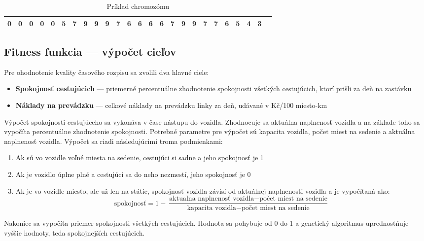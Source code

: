 \begin{table}[h]\label{tab:chromosome}
  \centering
  \begin{tabularx}{\textwidth}{|l|X|X|X|X|X|X|X|X|X|X|X|X|X|X|X|X|X|X|X|X|X|X|X|X|}
    \hline
    0 & 0 & 0 & 0 & 0 & 5 & 7 & 9 & 9 & 9 & 7 & 6 & 6 & 6 & 6 & 7 & 9 & 9 & 7 & 7 & 6 & 5 & 4 & 3 \\ \hline
  \end{tabularx}
  \caption{Príklad chromozómu}
\end{table}



\subsection*{Fitness funkcia --- výpočet cieľov}
Pre ohodnotenie kvality časového rozpisu sa zvolili dva hlavné ciele:
\begin{itemize}
  \item \textbf{Spokojnosť cestujúcich} --- priemerné percentuálne zhodnotenie spokojnosti všetkých cestujúcich, ktorí prišli za deň na zastávku
  \item \textbf{Náklady na prevádzku} --- celkové náklady na prevádzku linky za deň, udávané v Kč/100 miesto-km
\end{itemize}

Výpočet spokojnosti cestujúceho sa vykonáva v čase nástupu do vozidla. Zhodnocuje sa aktuálna naplnenosť vozidla a na základe toho sa vypočíta percentuálne zhodnotenie spokojnosti.
Potrebné parametre pre výpočet sú kapacita vozidla, počet miest na sedenie a aktuálna naplnenosť vozidla.
Výpočet sa riadi následujúcimi troma podmienkami:
\begin{enumerate}
  \item Ak sú vo vozidle voľné miesta na sedenie, cestujúci si sadne a jeho spokojnosť je 1
  \item Ak je vozidlo úplne plné a cestujúci sa do neho nezmestí, jeho spokojnosť je 0
  \item Ak je vo vozidle miesto, ale už len na státie, spokojnosť vozidla závisí od aktuálnej naplnenosti vozidla a je vypočítaná ako: \begin{equation}
      \text{spokojnosť} = 1 - \frac{\text{aktualna naplnenosť vozidla} - \text{počet miest na sedenie}}{\text{kapacita vozidla}  - \text{počet miest na sedenie}}
    \end{equation}
\end{enumerate}
Nakoniec sa vypočíta priemer spokojnosti všetkých cestujúcich.
Hodnota sa pohybuje od 0 do 1 a genetický algoritmus uprednostňuje vyššie hodnoty, teda spokojnejších cestujúcich.

